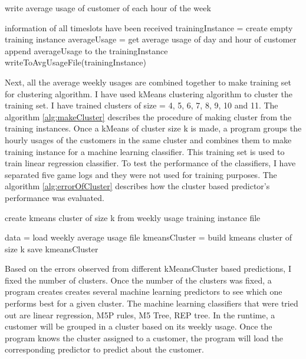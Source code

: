 \begin{algorithm} [!h]
\caption{write average usage of customer of each hour of the week}
\begin{algorithmic} [1]
\REQUIRE information of all timeslots have been received
	\STATE trainingInstance = create empty training instance
			\STATE averageUsage = get average usage of day and hour of customer
			\STATE append averageUsage to the trainingInstance
		\ENDFOR
	\ENDFOR
	\STATE writeToAvgUsageFile(trainingInstance)
\ENDFOR
\end{algorithmic}
\label{alg:writeWeeklyAvg}
\end{algorithm}


Next, all the average weekly usages are combined together to make training set for clustering algorithm. I have used kMeans clustering algorithm to cluster the  training set. I have trained clusters of size  = 4, 5, 6, 7, 8, 9, 10 and 11. The algorithm \ref{alg:makeCluster} describes the procedure of making cluster from the training instances. Once a kMeans of cluster size k is made, a program groups the hourly usages of the customers in the same cluster and combines them to make training instance for a machine learning classifier. This training set is used to train linear regression classifier. To test the performance of the classifiers, I have separated five game logs and they were not used for training purposes. The algorithm \ref{alg:errorOfCluster} describes how the cluster based predictor's performance was evaluated. 


\begin{algorithm}
\caption{create kmeans cluster of size k from weekly usage training instance file}
\begin{algorithmic} [1]
\STATE data = load weekly average usage file
\STATE kmeansCluster = build kmeans cluster of size k
\STATE save kmeansCluster
\end{algorithmic}
\label{alg:makeCluster}
\end{algorithm}


Based on the errors observed from different kMeansCluster based predictions, I fixed the number of clusters. Once the number of the clusters was fixed, a program creates creates several machine learning predictors to see which one performs best for a given cluster. The machine learning classifiers that were tried out are linear regression, M5P rules, M5 Tree, REP tree. In the runtime, a customer will be grouped in a cluster based on its weekly usage. Once the program knows the cluster assigned to a customer, the program will load the corresponding predictor to predict about the customer.

